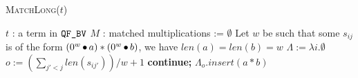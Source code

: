 \begin{algorithm}[t]
 \caption{\textsc{MatchLong}($t$)}
 \label{alg:long}
 \begin{algorithmic}[1]
   \Require $t$ : a term in $\texttt{QF\_BV}$
   \Ensure $M$ : matched multiplications := $\emptyset$
   \State Let $w$ be such that some $s_{ij}$ is of the form $ (0^{w} \mathop{\bullet} a) * (0^{w} \mathop{\bullet} b)$, we have $len(a) =len(b) = w$ %
   \State $\Lambda := \lambda i. \emptyset$
   \State $o := (\sum_{j' < j} len( s_{ij'}))/w + 1$
    {\bf continue;}
   \State $\Lambda_o.insert( a * b )$
   \Else~\Return{$\emptyset$}
   \EndIf
   \EndFor
   \State {}
   \EndIf
   \State \Return{$\emptyset$}
 \end{algorithmic}
\end{algorithm}  



